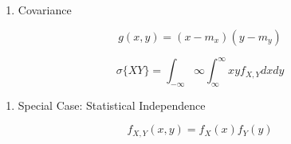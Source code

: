 \documentclass{article}
\begin{document}
\begin{enumerate}
\def\labelenumi{\arabic{enumi}.}
\setcounter{enumi}{1}
\item
  Covariance
\end{enumerate}

\[
g(x, y) = (x - m_x)(y - m_y)
\]

\[
\sigma\{XY\} = \int_{-\infty}{\infty} \int_{\infty}^{\infty} xy f_{X, Y} dx dy
\]

\begin{enumerate}
\def\labelenumi{\arabic{enumi}.}
\setcounter{enumi}{2}
\item
  Special Case: Statistical Independence
\end{enumerate}

\[
f_{X, Y}(x, y) = f_X(x)f_Y(y)
\]
\end{document}
